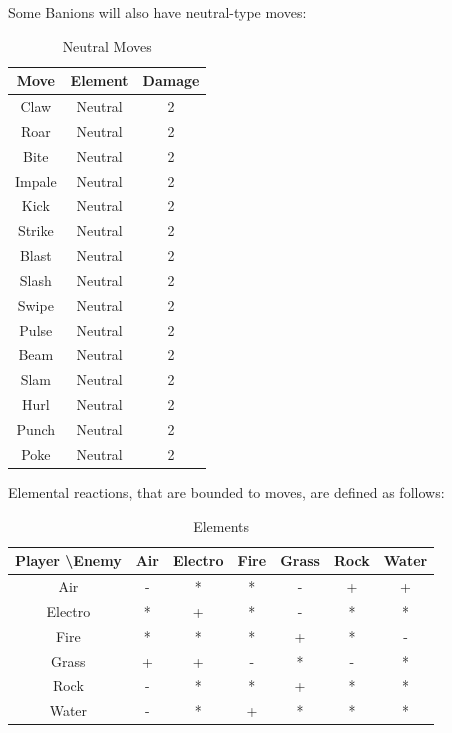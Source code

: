 \documentclass[12pt, a4paper]{report}
\begin{document}
    \pagebreak
    Some Banions will also have neutral-type moves:

\begin{table}[H]
    \begin{center}
    \begin{tabular}{| c | c | c |}
        \hline
        Move & Element & Damage \\
        \hline \hline
        Claw & Neutral & 2 \\
        \hline
        Roar & Neutral & 2 \\
        \hline
        Bite & Neutral & 2 \\
        \hline
        Impale & Neutral & 2 \\
        \hline
        Kick & Neutral & 2 \\
        \hline
        Strike & Neutral & 2 \\
        \hline
        Blast & Neutral & 2 \\
        \hline
        Slash & Neutral & 2 \\
        \hline
        Swipe & Neutral & 2 \\
        \hline
        Pulse & Neutral & 2 \\
        \hline
        Beam & Neutral & 2 \\
        \hline
        Slam & Neutral & 2 \\
        \hline
        Hurl & Neutral & 2 \\
        \hline
        Punch & Neutral & 2 \\
        \hline
        Poke & Neutral & 2 \\
        \hline
    \end{tabular}
    \caption{\label{table:neutralMoves} Neutral Moves}
    \end{center}
\end{table}

    Elemental reactions, that are bounded to moves, are defined as follows:

\begin{table}[ht]
    \begin{center}
    \begin{tabular}{| c || c | c | c | c | c | c |}
        \hline
        Player \textbackslash Enemy & Air & Electro & Fire & Grass & Rock & Water \\ [0.5ex]
        \hline\hline
        Air         & - & * & * & - & + & + \\
        \hline
        Electro     & * & + & * & - & * & * \\
        \hline
        Fire        & * & * & * & + & * & - \\
        \hline
        Grass       & + & + & - & * & - & * \\
        \hline
        Rock        & - & * & * & + & * & * \\
        \hline
        Water       & - & * & + & * & * & * \\
        \hline
    \end{tabular}
    \caption{\label{table:elements} Elements}
    \end{center}
\end{table}
\end{document}
